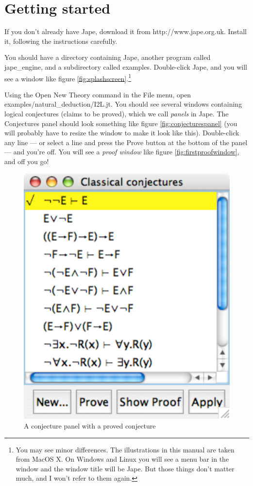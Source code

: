 \documentclass[11pt]{book}
\newcommand{\figref}[1]{figure \ref{fig:#1}}
\begin{document}
\section{Getting started}

If you don't already have Jape, download it from http://www.jape.org.uk. Install it, following the instructions carefully.

You should have a directory containing Jape, another program called jape\_engine, and a subdirectory called examples. Double-click Jape, and you will see a window like \figref{splashscreen}.\footnote{You may see minor differences. The illustrations in this manual are taken from MacOS X. On Windows and Linux you will see a menu bar in the window and the window title will be Jape. But those things don't matter much, and I won't refer to them again.}

Using the Open New Theory command in  the File menu, open examples/natural\_deduction/I2L.jt. You should see several windows containing logical conjectures (claims to be proved), which we call \emph{panels} in Jape. The Conjectures panel should look something like \figref{conjecturespanel} (you will probably have to resize the window to make it look like this). Double-click any line --- or select a line and press the Prove button at the bottom of the panel --- and you're off. You will see a \emph{proof window} like \figref{firstproofwindow}, and off you go!

\begin{figure}
\centering
\includegraphics[scale=0.5]{pics/provedconjecture}
\caption{A conjecture panel with a proved conjecture}
\label{fig:provedconjecture}
\end{figure}
\end{document}
